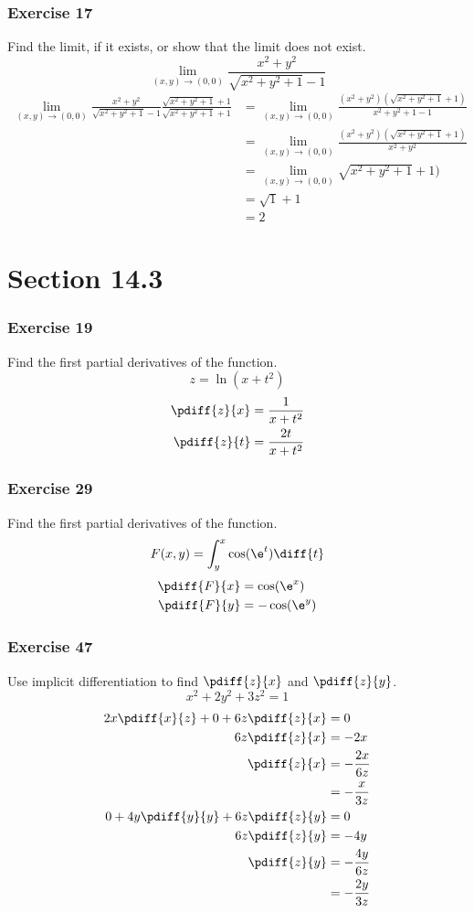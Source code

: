\documentclass[letterpaper, 12pt]{math}
\begin{document}
\subsubsection*{Exercise 17}
Find the limit, if it exists, or show that the limit does not exist.
\[ \lim_{(x,y)\to(0,0)}\frac{x^2+y^2}{\sqrt{x^2+y^2+1}-1} \]
\begin{align*}
  \lim_{(x,y)\to(0,0)}\frac{x^2+y^2}{\sqrt{x^2+y^2+1}-1}
    \frac{\sqrt{x^2+y^2+1}+1}{\sqrt{x^2+y^2+1}+1} &=
    \lim_{(x,y)\to(0,0)}\frac{(x^2+y^2)(\sqrt{x^2+y^2+1}+1)}{x^2+y^2+1-1} \\
  &= \lim_{(x,y)\to(0,0)}\frac{(x^2+y^2)(\sqrt{x^2+y^2+1}+1)}{x^2+y^2} \\
  &= \lim_{(x,y)\to(0,0)}\sqrt{x^2+y^2+1}+1) \\
  &= \sqrt{1}+1 \\
  &= 2
\end{align*}

\section*{Section 14.3}

\subsubsection*{Exercise 19}
Find the first partial derivatives of the function.
\[ z = \ln(x+t^2) \]
\begin{align*}
  \pdiff{z}{x} &= \frac{1}{x+t^2} \\
  \pdiff{z}{t} &= \frac{2t}{x+t^2}
\end{align*}

\subsubsection*{Exercise 29}
Find the first partial derivatives of the function.
\[ F(x,y) = \int_{y}^{x}\cos(\e^t)\diff{t} \]
\begin{align*}
  \pdiff{F}{x} &= \cos(\e^x) \\
  \pdiff{F}{y} &= -\cos(\e^y)
\end{align*}

\subsubsection*{Exercise 47}
Use implicit differentiation to find \( \pdiff{z}{x} \) and \( \pdiff{z}{y} \).
\[ x^2+2y^2+3z^2 = 1 \]
\begin{align*}
  2x\pdiff{x}{z}+0+6z\pdiff{z}{x} &= 0 \\
  6z\pdiff{z}{x} &= -2x \\
  \pdiff{z}{x} &= -\frac{2x}{6z} \\
  &= -\frac{x}{3z} \\
  0+4y\pdiff{y}{y}+6z\pdiff{z}{y} &= 0 \\
  6z\pdiff{z}{y} &= -4y \\
  \pdiff{z}{y} &= -\frac{4y}{6z} \\
  &= -\frac{2y}{3z}
\end{align*}
\end{document}
